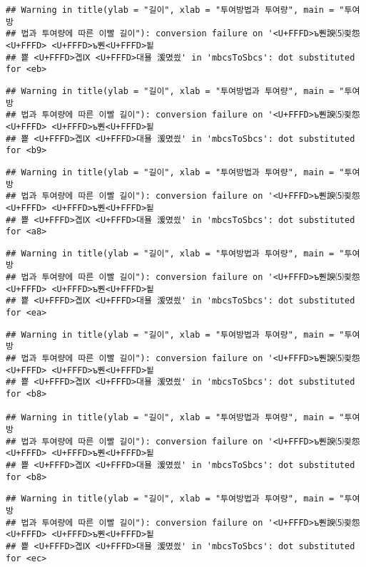 \documentclass[]{article}
\begin{document}
\begin{verbatim}
## Warning in title(ylab = "길이", xlab = "투여방법과 투여량", main = "투여방
## 법과 투여량에 따른 이빨 길이"): conversion failure on '<U+FFFD>ъ뿬諛⑸쾿怨<U+FFFD> <U+FFFD>ъ뿬<U+FFFD>됱
## 뿉 <U+FFFD>곕Ⅸ <U+FFFD>대묠 湲몄씠' in 'mbcsToSbcs': dot substituted for <eb>
\end{verbatim}

\begin{verbatim}
## Warning in title(ylab = "길이", xlab = "투여방법과 투여량", main = "투여방
## 법과 투여량에 따른 이빨 길이"): conversion failure on '<U+FFFD>ъ뿬諛⑸쾿怨<U+FFFD> <U+FFFD>ъ뿬<U+FFFD>됱
## 뿉 <U+FFFD>곕Ⅸ <U+FFFD>대묠 湲몄씠' in 'mbcsToSbcs': dot substituted for <b9>
\end{verbatim}

\begin{verbatim}
## Warning in title(ylab = "길이", xlab = "투여방법과 투여량", main = "투여방
## 법과 투여량에 따른 이빨 길이"): conversion failure on '<U+FFFD>ъ뿬諛⑸쾿怨<U+FFFD> <U+FFFD>ъ뿬<U+FFFD>됱
## 뿉 <U+FFFD>곕Ⅸ <U+FFFD>대묠 湲몄씠' in 'mbcsToSbcs': dot substituted for <a8>
\end{verbatim}

\begin{verbatim}
## Warning in title(ylab = "길이", xlab = "투여방법과 투여량", main = "투여방
## 법과 투여량에 따른 이빨 길이"): conversion failure on '<U+FFFD>ъ뿬諛⑸쾿怨<U+FFFD> <U+FFFD>ъ뿬<U+FFFD>됱
## 뿉 <U+FFFD>곕Ⅸ <U+FFFD>대묠 湲몄씠' in 'mbcsToSbcs': dot substituted for <ea>
\end{verbatim}

\begin{verbatim}
## Warning in title(ylab = "길이", xlab = "투여방법과 투여량", main = "투여방
## 법과 투여량에 따른 이빨 길이"): conversion failure on '<U+FFFD>ъ뿬諛⑸쾿怨<U+FFFD> <U+FFFD>ъ뿬<U+FFFD>됱
## 뿉 <U+FFFD>곕Ⅸ <U+FFFD>대묠 湲몄씠' in 'mbcsToSbcs': dot substituted for <b8>

## Warning in title(ylab = "길이", xlab = "투여방법과 투여량", main = "투여방
## 법과 투여량에 따른 이빨 길이"): conversion failure on '<U+FFFD>ъ뿬諛⑸쾿怨<U+FFFD> <U+FFFD>ъ뿬<U+FFFD>됱
## 뿉 <U+FFFD>곕Ⅸ <U+FFFD>대묠 湲몄씠' in 'mbcsToSbcs': dot substituted for <b8>
\end{verbatim}

\begin{verbatim}
## Warning in title(ylab = "길이", xlab = "투여방법과 투여량", main = "투여방
## 법과 투여량에 따른 이빨 길이"): conversion failure on '<U+FFFD>ъ뿬諛⑸쾿怨<U+FFFD> <U+FFFD>ъ뿬<U+FFFD>됱
## 뿉 <U+FFFD>곕Ⅸ <U+FFFD>대묠 湲몄씠' in 'mbcsToSbcs': dot substituted for <ec>
\end{verbatim}
\end{document}
